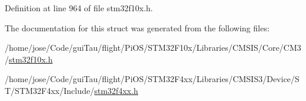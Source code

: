 Definition at line 964 of file stm32f10x.\-h.



The documentation for this struct was generated from the following files\-:\begin{DoxyCompactItemize}
\item 
/home/jose/\-Code/gui\-Tau/flight/\-Pi\-O\-S/\-S\-T\-M32\-F10x/\-Libraries/\-C\-M\-S\-I\-S/\-Core/\-C\-M3/\hyperlink{stm32f10x_8h}{stm32f10x.\-h}\item 
/home/jose/\-Code/gui\-Tau/flight/\-Pi\-O\-S/\-S\-T\-M32\-F4xx/\-Libraries/\-C\-M\-S\-I\-S3/\-Device/\-S\-T/\-S\-T\-M32\-F4xx/\-Include/\hyperlink{stm32f4xx_8h}{stm32f4xx.\-h}\end{DoxyCompactItemize}
